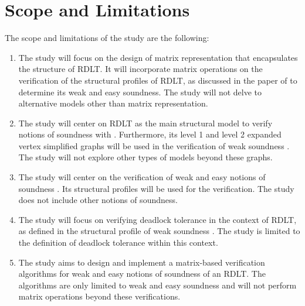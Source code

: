 \section{Scope and Limitations}
The scope and limitations of the study are the following:
\begin{enumerate}
    \item The study will focus on the design of matrix representation that encapsulates the structure of RDLT. It will incorporate matrix operations on the verification of the structural profiles of RDLT, as discussed in the paper of \cite{Ramirez2024} to determine its weak and easy soundness. The study will not delve to alternative models other than matrix representation.
    \item The study will center on RDLT as the main structural model to verify notions of soundness with \cite{Malinao2017}. Furthermore, its level 1 and level 2 expanded vertex simplified graphs will be used in the verification of weak soundness \cite{MalinaoWCTP2023}. The study will not explore other types of models beyond these graphs.
    \item The study will center on the verification of weak and easy notions of soundness \cite{Malinao2017} \cite{Ramirez2024}. Its structural profiles will be used for the verification. The study does not include other notions of soundness.
    \item The study will focus on verifying deadlock tolerance in the context of RDLT, as defined in the structural profile of weak soundness \cite{Ramirez2024}. The study is limited to the definition of deadlock tolerance within this context.
    \item The study aims to design and implement a matrix-based verification algorithms for weak and easy notions of soundness of an RDLT. The algorithms are only limited to weak and easy soundness and will not perform matrix operations beyond these verifications.
\end{enumerate}

